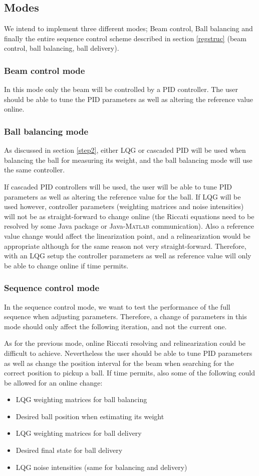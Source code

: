\documentclass{article}
\begin{document}
\subsection{Modes}
We intend to implement three different modes; Beam control, Ball balancing and finally the entire sequence control scheme described in section \ref{regstruc} (beam control, ball balancing, ball delivery).
\subsubsection{Beam control mode}
In this mode only the beam will be controlled by a PID controller. The user should be able to tune the PID parameters as well as altering the reference value online.

\subsubsection{Ball balancing mode}
As discussed in section \ref{step2}, either LQG or cascaded PID will be used when balancing the ball for measuring its weight, and the ball balancing mode will use the same controller.

If cascaded PID controllers will be used, the user will be able to tune PID parameters as well as altering the reference value for the ball. If LQG will be used however, controller parameters (weighting matrices and noise intensities) will not be as straight-forward to change online (the Riccati equations need to be resolved by some Java package or Java-\textsc{Matlab} communication). Also a reference value change would affect the linearization point, and a relinearization would be appropriate although for the same reason not very straight-forward. Therefore, with an LQG setup the controller parameters as well as reference value will only be able to change online if time permits.

\subsubsection{Sequence control mode}
In the sequence control mode, we want to test the performance of the full sequence when adjusting parameters. Therefore, a change of parameters in this mode should only affect the following iteration, and not the current one.

As for the previous mode, online Riccati resolving and relinearization could be difficult to achieve. Nevertheless the user should be able to tune PID parameters as well as change the position interval for the beam when searching for the correct position to pickup a ball. If time permits, also some of the following could be allowed for an online change:
\begin{itemize}
\item LQG weighting matrices for ball balancing
\item Desired ball position when estimating its weight
\item LQG weighting matrices for ball delivery
\item Desired final state for ball delivery
\item LQG noise intensities (same for balancing and delivery)
\end{itemize}
\end{document}
